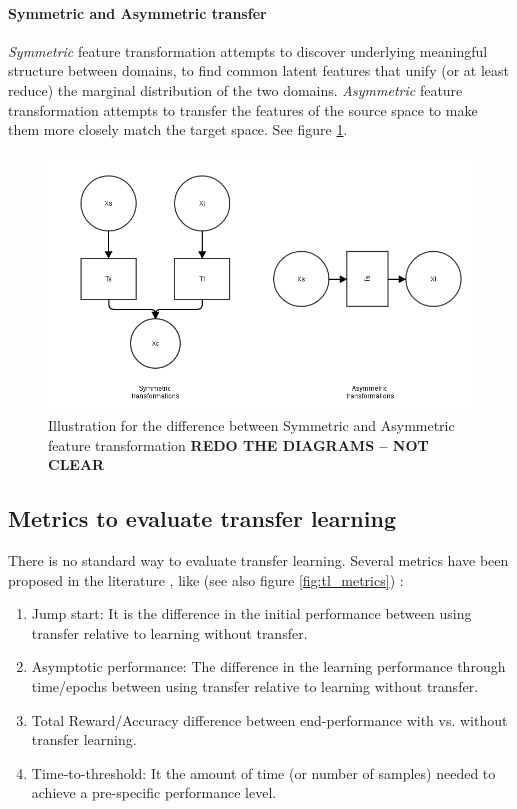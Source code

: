 \paragraph{Symmetric and Asymmetric transfer} \textit{Symmetric} feature transformation attempts to discover underlying meaningful structure between domains, to find common latent features that unify (or at least reduce) the marginal distribution of the two domains. \textit{Asymmetric} feature transformation attempts to transfer the features of the source space to make them more closely match the target space. See figure \ref{fig:feature_transformation}.

\begin{figure}[!htbp]
\centering
\includegraphics[scale=0.4]{images/sota/feature_transformation.png}
\caption[Symmetric and Asymmetric transfer]{Illustration for the difference between Symmetric and Asymmetric feature transformation \textbf{REDO THE DIAGRAMS -- NOT CLEAR}}
\label{fig:feature_transformation}
\end{figure}

\subsection{Metrics to evaluate transfer learning}
\par There is no standard way to evaluate transfer learning. Several metrics have been proposed in the literature \citep{taylor2007cross}, like (see also figure \ref{fig:tl_metrics}) :
\begin{enumerate}
    \item Jump start: It is the difference in the initial performance between using transfer relative to learning without transfer.
    \item Asymptotic performance: The difference in the learning performance through time/epochs between using transfer relative to learning without transfer.
    \item Total Reward/Accuracy difference between end-performance with vs. without transfer learning.
    \item Time-to-threshold: It the amount of time (or number of samples) needed to achieve a pre-specific performance level.
\end{enumerate}

